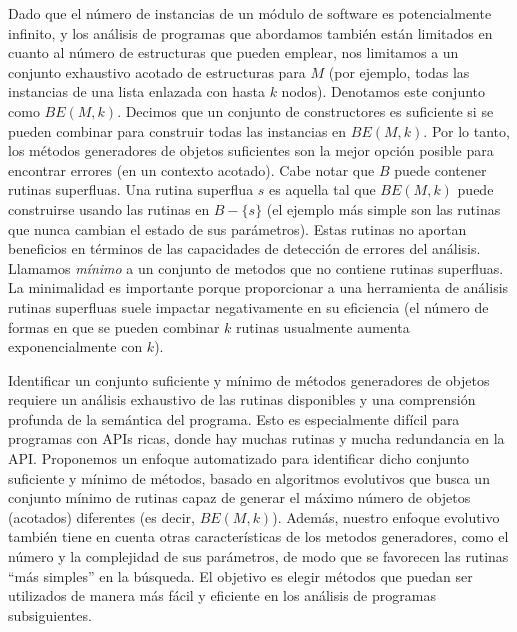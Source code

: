 Dado que el número de instancias de un módulo de software es potencialmente infinito, y los análisis de programas que abordamos también están limitados en cuanto al número de estructuras que pueden emplear, nos limitamos a un conjunto exhaustivo acotado de estructuras para \( M \) \cite{Boyapati02} (por ejemplo, todas las instancias de una lista enlazada con hasta \( k \) nodos). Denotamos este conjunto como \( BE(M, k) \). Decimos que un conjunto de constructores es suficiente si se pueden combinar para construir todas las instancias en \( BE(M, k) \). Por lo tanto, los métodos generadores de objetos suficientes son la mejor opción posible para encontrar errores (en un contexto acotado). Cabe notar que \( B \) puede contener rutinas superfluas. Una rutina superflua \( s \) es aquella tal que \( BE(M, k) \) puede construirse usando las rutinas en \( B - \{s\} \) (el ejemplo más simple son las rutinas que nunca cambian el estado de sus parámetros). Estas rutinas no aportan beneficios en términos de las capacidades de detección de errores del análisis. Llamamos \emph{mínimo} a un conjunto de metodos que no contiene rutinas superfluas. La minimalidad es importante porque proporcionar a una herramienta de análisis rutinas superfluas suele impactar negativamente en su eficiencia (el número de formas en que se pueden combinar \( k \) rutinas usualmente aumenta exponencialmente con \( k \)).

Identificar un conjunto suficiente y mínimo de métodos generadores de objetos requiere un análisis exhaustivo de las rutinas disponibles y una comprensión profunda de la semántica del programa. Esto es especialmente difícil para programas con APIs ricas, donde hay muchas rutinas y mucha redundancia en la API. Proponemos un enfoque automatizado para identificar dicho conjunto suficiente y mínimo de métodos, basado en algoritmos evolutivos que busca un conjunto mínimo de rutinas capaz de generar el máximo número de objetos (acotados) diferentes (es decir, \( BE(M, k) \)). Además, nuestro enfoque evolutivo también tiene en cuenta otras características de los metodos generadores, como el número y la complejidad de sus parámetros, de modo que se favorecen las rutinas “más simples” en la búsqueda. El objetivo es elegir métodos que puedan ser utilizados de manera más fácil y eficiente en los análisis de programas subsiguientes.

